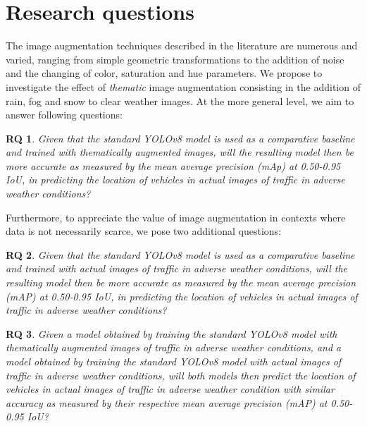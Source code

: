 \documentclass[]{article}
\newtheorem{researchquestion}{RQ}
\begin{document}
\section{Research questions}

	The image augmentation techniques described in the literature are numerous and varied, ranging from simple geometric transformations to the addition of noise and the changing of color, saturation and hue parameters. We propose to investigate the effect of \textit{thematic} image augmentation consisting in the addition of rain, fog and snow to clear weather images. At the more general level, we aim to answer following questions:

	\begin{researchquestion}
		\label{rq1}
		Given that the standard YOLO{\small v8} model is used as a comparative baseline and trained with thematically augmented images, will the resulting model then be more accurate as measured by the mean average precision (mAp) at 0.50-0.95 IoU, in predicting the location of vehicles in actual images of traffic in adverse weather conditions?
	\end{researchquestion}

	Furthermore, to appreciate the value of image augmentation in contexts where data is not necessarily scarce, we pose two additional questions:
	\begin{researchquestion}
		\label{rq2}
		Given that the standard YOLO{\small v8} model is used as a comparative baseline and trained with actual images of traffic in adverse weather conditions, will the resulting model then be more accurate as measured by the mean average precision (mAP) at 0.50-0.95 IoU, in predicting the location of vehicles in actual images of traffic in adverse weather conditions?
	\end{researchquestion}

	\begin{researchquestion}
		\label{rq3}
		Given a model obtained by training the standard YOLO{\small v8} model with thematically augmented images of traffic in adverse weather conditions, and a model obtained by training the standard YOLO{\small v8} model with actual images of traffic in adverse weather conditions, will both models then predict the location of vehicles in actual images of traffic in adverse weather condition with similar accuracy as measured by their respective mean average precision (mAP) at 0.50-0.95 IoU?
	\end{researchquestion}
\end{document}
